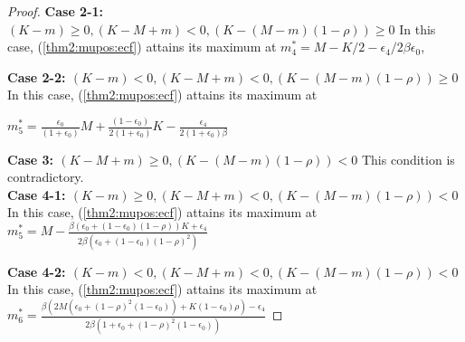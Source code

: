 \documentclass[11pt]{article}
\theoremstyle{plain}
\numberwithin{equation}{section}
\begin{document}
{\begin{proof}
\noindent\textbf{Case 2-1: $(K-m)\geq  0, (K-M+m)< 0, (K-(M-m)(1-\rho))\geq 0$}
In this case, (\ref{thm2:mupos:ecf}) attains its maximum at 
$m^*_4=M-K/2-\epsilon_4/2\beta\epsilon_0$,



\noindent\textbf{Case 2-2: $(K-m)<  0, (K-M+m)< 0, (K-(M-m)(1-\rho))\geq 0$}
In this case, (\ref{thm2:mupos:ecf}) attains its maximum at

$m^*_5=\frac{\epsilon_0}{(1+\epsilon_0)}M +\frac{(1-\epsilon_0)}{2(1+\epsilon_0)}K-\frac{\epsilon_4}{2(1+\epsilon_0)\beta}
$



\noindent\textbf{Case 3: $(K-M+m)\geq 0, (K-(M-m)(1-\rho))< 0$}
This condition is contradictory. \\
\noindent\textbf{Case 4-1: $(K-m)\geq  0, (K-M+m)< 0, (K-(M-m)(1-\rho))< 0$}
In this case, (\ref{thm2:mupos:ecf}) attains its maximum at
$m^*_5=M-\frac{\beta(\epsilon_0+(1-\epsilon_0)(1-\rho))K+\epsilon_4}{2\beta(\epsilon_0+(1-\epsilon_0)(1-\rho)^2)}$


\noindent\textbf{Case 4-2: $(K-m)<  0, (K-M+m)<0, (K-(M-m)(1-\rho))< 0$}
%
In this case, (\ref{thm2:mupos:ecf}) attains its maximum at
$m^*_6=\frac{\beta (2M(\epsilon_0+(1-\rho)^2 (1-\epsilon_0)) +K(1-\epsilon_0)\rho)-\epsilon_4}{2\beta (1+\epsilon_0+(1-\rho)^2 (1-\epsilon_0))}$



\end{proof}}
\end{document}
